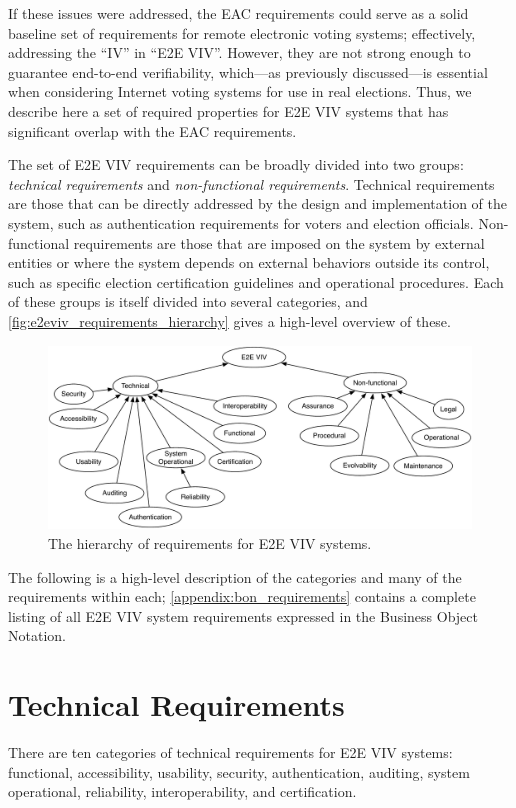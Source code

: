 If these issues were addressed, the EAC requirements could serve as a
solid baseline set of requirements for remote electronic voting
systems; effectively, addressing the ``IV'' in ``E2E VIV''. However,
they are not strong enough to guarantee end-to-end verifiability,
which---as previously discussed---is essential when considering
Internet voting systems for use in real elections.  Thus, we describe
here a set of required properties for E2E VIV systems that has
significant overlap with the EAC requirements.

The set of E2E VIV requirements can be broadly divided into two
groups: \emph{technical requirements} and \emph{non-functional
  requirements}. Technical requirements are those that can be directly
addressed by the design and implementation of the system, such as
authentication requirements for voters and election
officials. Non-functional requirements are those that are imposed on
the system by external entities or where the system depends on
external behaviors outside its control, such as specific election
certification guidelines and operational procedures. Each of these
groups is itself divided into several categories, and
\autoref{fig:e2eviv_requirements_hierarchy} gives a high-level
overview of these.

\begin{figure}
\begin{center}
\includegraphics[width=6in]{required_properties_resources/hierarchy}
\end{center}
\caption{The hierarchy of requirements for E2E VIV systems.}
\label{fig:e2eviv_requirements_hierarchy}
\end{figure}

The following is a high-level description of the categories and many
of the requirements within each; \autoref{appendix:bon_requirements}
contains a complete listing of all E2E VIV system requirements
expressed in the Business Object Notation.

\section{Technical Requirements}
There are ten categories of technical requirements for E2E VIV
systems: functional, accessibility, usability, security,
authentication, auditing, system operational, reliability,
interoperability, and certification. 

